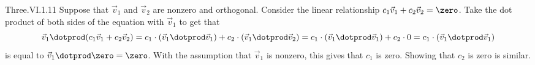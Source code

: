 \begin{ans}{Three.VI.1.11}
      Suppose that $\vec{v}_1$ and $\vec{v}_2$ are nonzero and orthogonal.
      Consider the linear relationship
      $c_1\vec{v}_1+c_2\vec{v}_2=\zero$.
      Take the dot product of both sides
      of the equation with $\vec{v}_1$ to get that
      \begin{equation*}
        \vec{v}_1\dotprod(c_1\vec{v}_1+c_2\vec{v}_2)
        =c_1\cdot(\vec{v}_1\dotprod\vec{v}_1)
           +c_2\cdot(\vec{v}_1\dotprod\vec{v}_2)
        =c_1\cdot (\vec{v}_1\dotprod\vec{v}_1)+c_2\cdot 0
        =c_1\cdot (\vec{v}_1\dotprod\vec{v}_1)
      \end{equation*}
      is equal to $\vec{v}_1\dotprod\zero=\zero$.
      With the assumption that $\vec{v}_1$ is nonzero, this gives that
      $c_1$ is zero.
      Showing that $c_2$ is zero is similar.
    
\end{ans}
